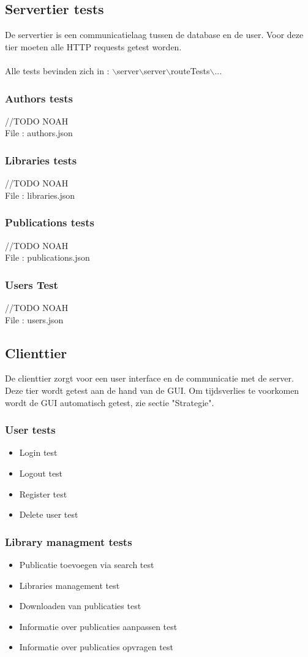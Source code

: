 \documentclass{article}
\begin{document}
\subsection{Servertier tests}
De servertier is een communicatielaag tussen de database en de user. Voor deze tier moeten alle HTTP requests getest worden.
\\\\
Alle tests bevinden zich in : $\backslash$server$\backslash$server$\backslash$routeTests$\backslash$...
\subsubsection{Authors tests}
//TODO NOAH\\
File : authors.json
\subsubsection{Libraries tests}
//TODO NOAH\\
File : libraries.json
\subsubsection{Publications tests}
//TODO NOAH\\
File : publications.json
\subsubsection{Users Test}
//TODO NOAH\\
File : users.json
\subsection{Clienttier}
De clienttier zorgt voor een user interface en de communicatie met de server. Deze tier wordt getest aan de hand van de GUI. Om tijdsverlies te voorkomen wordt de GUI automatisch getest, zie sectie "Strategie".
\subsubsection{User tests}
\begin{itemize}
  \item Login test
  \item Logout test 
  \item Register test
  \item Delete user test
\end{itemize}
\subsubsection{Library managment tests}
\begin{itemize}
  \item Publicatie toevoegen via search test
  \item Libraries management test
  \item Downloaden van publicaties test
  \item Informatie over publicaties aanpassen test
  \item Informatie over publicaties opvragen test
\end{itemize}
\end{document}
